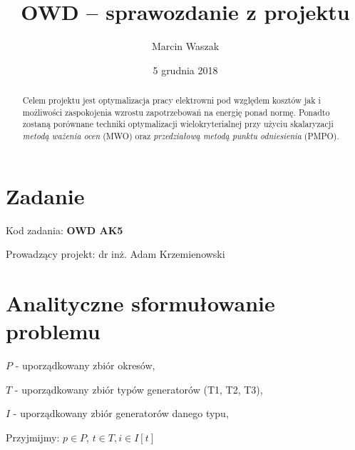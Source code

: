 \documentclass[12pt, twoside, hidelinks, a4paper]{article}
\begin{document}

\author{Marcin Waszak}
\title{OWD -- sprawozdanie z projektu}
\date{5 grudnia 2018}


\maketitle

\begin{abstract}
Celem projektu jest optymalizacja pracy elektrowni pod względem kosztów jak i możliwości zaspokojenia wzrostu zapotrzebowań na energię ponad normę. Ponadto zostaną porównane techniki optymalizacji wielokryterialnej przy użyciu skalaryzacji \textit{metodą ważenia ocen} (MWO) oraz \textit{przedziałową metodą punktu odniesienia} (PMPO).
\end{abstract}

\section{Zadanie}
Kod zadania: \textbf{OWD AK5}

Prowadzący projekt: dr inż. Adam Krzemienowski

\section{Analityczne sformułowanie problemu}
$P$ - uporządkowany zbiór okresów,

$T$ - uporządkowany zbiór typów generatorów (T1, T2, T3),

$I$ - uporządkowany zbiór generatorów danego typu,

Przyjmijmy: $p \in P$, $t \in T, i \in I[t]$
\end{document}
